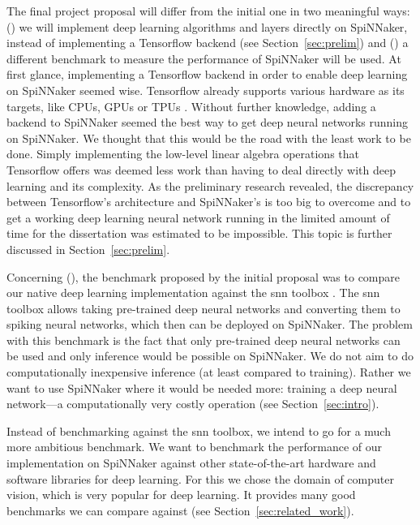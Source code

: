 \documentclass{article}
\begin{document}
The final project proposal will differ from the initial one
in two meaningful ways: () we will implement
deep learning algorithms and layers directly on SpiNNaker,
instead of implementing a Tensorflow backend (see
Section~\ref{sec:prelim}) and () a different
benchmark to measure the performance of SpiNNaker will be used.
At first glance, implementing a Tensorflow backend in order to
enable deep learning on SpiNNaker seemed wise.
Tensorflow already supports various hardware as its targets, like
CPUs, GPUs or TPUs \citep{tf2015, jouppi_2016}.
Without further knowledge, adding a backend to SpiNNaker
seemed the best way to get deep neural networks running on SpiNNaker.
We thought that this would be the road with the least work to be done.
Simply implementing the low-level linear algebra operations that
Tensorflow offers was deemed less work than having to deal directly
with deep learning and its complexity.
As the preliminary research revealed, the discrepancy between
Tensorflow's architecture and SpiNNaker's is too big to overcome and
to get a working deep learning neural network running in the limited
amount of time for the dissertation was estimated to be impossible.
This topic is further discussed in Section~\ref{sec:prelim}.

Concerning (), the benchmark proposed by the
initial proposal was to compare our native deep learning
implementation against the snn toolbox
\citep{rueckauer_et_al_2017}.
The snn toolbox allows taking pre-trained deep neural
networks and converting them to spiking neural networks, which
then can be deployed on SpiNNaker.
The problem with this benchmark is the fact that only
pre-trained deep neural networks can be used and only
inference would be possible on SpiNNaker.
We do not aim to do computationally inexpensive inference
(at least compared to training).
Rather we want to use SpiNNaker where it would be needed more:
training a deep neural network---a computationally very costly
operation (see Section~\ref{sec:intro}).

Instead of benchmarking against the snn toolbox, we intend
to go for a much more ambitious benchmark.
We want to benchmark the performance of our implementation
on SpiNNaker against other state-of-the-art hardware and
software libraries for deep learning.
For this we chose the domain of computer vision, which is very popular
for deep learning.
It provides many good benchmarks we can compare against
(see Section~\ref{sec:related_work}).
\end{document}
